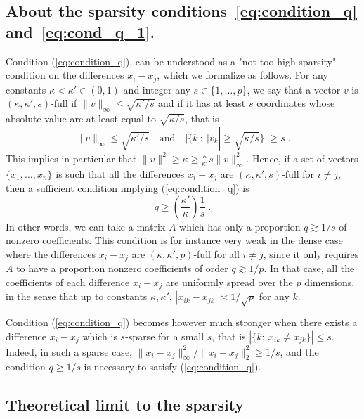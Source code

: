 \documentclass{ps}
\newcommand{\1}{\mathbbm{1}}
\theoremstyle{plain}
\begin{document}
\subsection{About the sparsity conditions~\eqref{eq:condition_q} and~\eqref{eq:cond_q_1}.}
Condition (\ref{eq:condition_q}), can be understood as a "not-too-high-sparsity" condition on the differences $x_i - x_j$, which we formalize as follows. For any constants $\kappa<\kappa' \in (0,1)$ and integer any $s \in \{1, \dots, p\}$, we say that a vector $v$ is $(\kappa,\kappa',s)$-full if $\|v\|_{\infty} \leq \sqrt{\kappa'/s}$ and if it has at least $s$ coordinates whose absolute value are at least equal to $\sqrt{\kappa/s}$, that is
\begin{equation}\label{eq:full}
	\|v\|_{\infty} \leq \sqrt{\kappa'/s}\quad \text{and} \quad|\{k~:~ |v_k| \geq \sqrt{\kappa/s}\}| \geq s \; .
\end{equation}
This implies in particular that $\|v\|^2 \geq \kappa \geq \tfrac{\kappa}{\kappa'}s\|v\|_{\infty}^2$. Hence, if a set of vectors $\{x_1, \dots, x_n\}$ is such that all the differences $x_i - x_j$ are $(\kappa,\kappa',s)$-full for $i \neq j$, then a sufficient condition implying (\ref{eq:condition_q}) is
\begin{equation}\label{eq:condition_suffisante_q}
	q \geq \left(\frac{\kappa'}{\kappa}\right) \frac{1}{s} \; .
\end{equation}
In other words, we can take a matrix $A$ which has only a proportion $q \gtrsim 1/s$ of nonzero coefficients. This condition is for instance very weak in the dense case where the differences $x_i - x_j$ are $(\kappa, \kappa', p)$-full for all $i\neq j$, since it only requires $A$ to have a proportion nonzero coefficients of order $q \gtrsim 1/p$. In that case, all the coefficients of each difference $x_i -x_j$ are uniformly spread over the $p$ dimensions, in the sense that up to constants $\kappa, \kappa'$, $|x_{ik} - x_{jk}| \asymp 1/\sqrt{p}$ for any $k$. 

Condition (\ref{eq:condition_q}) becomes however much stronger when there exists a difference $x_i - x_j$ which is $s$-sparse for a small $s$, that is $|\{ k:~ x_{ik} \neq x_{jk}\}| \leq s$. Indeed, in such a sparse case, $\|x_i - x_j\|^2_{\infty}/\|x_i - x_j\|_2^2 \geq 1/s$, and the condition $q \geq 1/s$ is necessary to satisfy (\ref{eq:condition_q}).

\subsection{Theoretical limit to the sparsity}\label{subsec:optimality}
\end{document}
